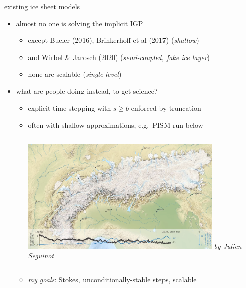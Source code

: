 \documentclass[usepdftitle=false,usenames,dvipsnames]{beamer}
\begin{document}
\begin{frame}{existing ice sheet models}

\begin{itemize}
\item almost no one is solving the implicit IGP
    \begin{itemize}
    \item except Bueler (2016), Brinkerhoff et al (2017) (\emph{shallow})
    \item and Wirbel \& Jarosch (2020) (\emph{semi-coupled, fake ice layer})
    \item none are scalable (\emph{single level})
    \end{itemize}
\item what are people doing instead, to get science?
    \begin{itemize}
    \item \alert{explicit time-stepping with $s \ge b$ enforced by truncation}
    \item often with shallow approximations, e.g.~PISM run below

\medskip
\begin{columns}
        \includegraphics[width=0.8\textwidth]{figs/seguinot.png}
        \scriptsize \emph{by Julien Seguinot}
\end{columns}

\medskip
    \item \emph{my goals}: Stokes, unconditionally-stable steps, scalable
    \end{itemize}
\end{itemize}
\end{frame}
\end{document}
